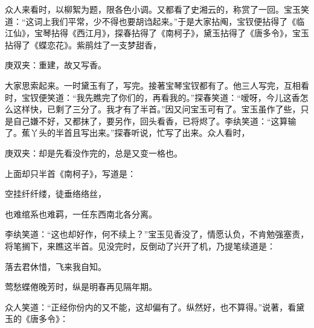 \begin{parag}
    众人来看时，以柳絮为题，限各色小调。又都看了史湘云的，称赏了一回。宝玉笑道：“这词上我们平常，少不得也要胡诌起来。”于是大家拈阄，宝钗便拈得了《临江仙》，宝琴拈得《西江月》，探春拈得了《南柯子》，黛玉拈得了《唐多令》，宝玉拈得了《蝶恋花》。紫鹃炷了一支梦甜香，\begin{note}庚双夹：重建，故又写香。\end{note}大家思索起来。一时黛玉有了，写完。接著宝琴宝钗都有了。他三人写完，互相看时，宝钗便笑道：“我先瞧完了你们的，再看我的。”探春笑道：“嗳呀，今儿这香怎么这样快，已剩了三分了。我才有了半首。”因又问宝玉可有了。宝玉虽作了些，只是自己嫌不好，又都抹了，要另作，回头看香，已将烬了。李纨笑道：“这算输了。蕉丫头的半首且写出来。”探春听说，忙写了出来。众人看时，\begin{note}庚双夹：却是先看没作完的，总是又变一格也。\end{note}上面却只半首《南柯子》，写道是：
\end{parag}


\begin{poem}
    \begin{pl}空挂纤纤缕，徒垂络络丝，\end{pl}

    \begin{pl}也难绾系也难羁，一任东西南北各分离。\end{pl}
\end{poem}


\begin{parag}
    李纨笑道：“这也却好作，何不续上？”宝玉见香没了，情愿认负，不肯勉强塞责，将笔搁下，来瞧这半首。见没完时，反倒动了兴开了机，乃提笔续道是：
\end{parag}


\begin{poem}
    \begin{pl}落去君休惜，飞来我自知。\end{pl}

    \begin{pl}莺愁蝶倦晚芳时，纵是明春再见隔年期。\end{pl}

\end{poem}


\begin{parag}
    众人笑道：“正经你份内的又不能，这却偏有了。纵然好，也不算得。”说著，看黛玉的《唐多令》：
\end{parag}



